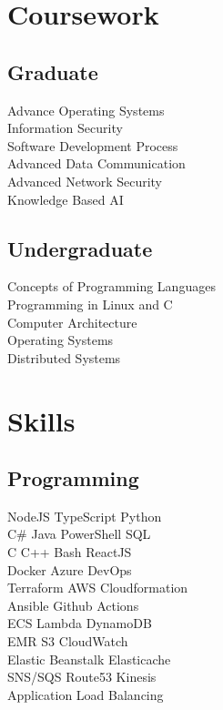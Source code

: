 \documentclass[]{deedy-resume-openfont}
\begin{document}
\begin{minipage}[t]{0.33\textwidth}
\section{Coursework}
\subsection{Graduate}
Advance Operating Systems \\
Information Security \\
Software Development Process \\
Advanced Data Communication \\
Advanced Network Security \\
Knowledge Based AI
\sectionsep
\subsection{Undergraduate}
Concepts of Programming Languages \\
Programming in Linux and C \\
Computer Architecture \\
Operating Systems \\
Distributed Systems
\sectionsep


\section{Skills}
\subsection{Programming}

NodeJS \textbullet{} TypeScript \textbullet{}  Python \\
C\# \textbullet{} Java \textbullet{} PowerShell \textbullet{} SQL \\
C \textbullet{} C++ \textbullet{} Bash \textbullet{} ReactJS \\

Docker \textbullet{} Azure DevOps  \\
Terraform \textbullet{} AWS Cloudformation \\
Ansible \textbullet{} Github Actions \\

ECS \textbullet{} Lambda \textbullet{} DynamoDB  \\
EMR \textbullet{} S3 \textbullet{} CloudWatch \\
Elastic Beanstalk \textbullet{} Elasticache  \\
SNS/SQS \textbullet{} Route53 \textbullet{} Kinesis \\
Application Load Balancing \\


\end{minipage}
\end{document}
